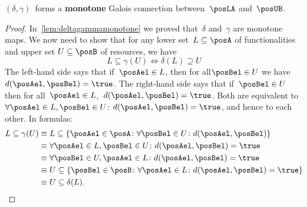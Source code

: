 \begin{lemma}
  $(\delta, \gamma)$~forms a \textbf{monotone} Galois connection between~$\posLA$ and~$\posUB$.
\end{lemma}
\begin{proof}
  In~\cref{lem:deltagammamonotone} we proved that~$\delta$ and~$\gamma$ are monotone maps.
  We now need to show that for any lower set~$L\subseteq \posA$ of functionalities and upper set $U\subseteq \posB$ of resources, we have
  \begin{equation}
    L\subseteq\gamma(U) \iff \delta(L)\supseteq U
  \end{equation}
  The left-hand side says that if~$\posAel\in L$, then for all$\posBel \in U$ we have $d(\posAel,\posBel)=\true$.
  The right-hand side says that if~$\posBel\in U$ then for all~$\posAel \in L$,~$d(\posAel,\posBel)=\true$.
  Both are equivalent to~$\forall \posAel\in L,\posBel\in U$: $d(\posAel,\posBel)=\true$, and hence to each other.
  In formulas:
  \begin{equation}
    \begin{aligned}
      L \subseteq \gamma(U)&\equiv L\subseteq \{\posAel \in \posA\colon \forall \posBel\in U\colon d(\posAel,\posBel)\} \\
      &\equiv \forall \posAel\in L, \posBel\in U \colon d(\posAel,\posBel)=\true \\
      &\equiv \forall \posBel\in U, \posAel\in L \colon d(\posAel,\posBel)=\true\\
      &\equiv U\subseteq \{\posBel\in \posB\colon \forall \posAel\in L\colon d(\posAel,\posBel)=\true \}\\
      &\equiv U\subseteq \delta(L).
    \end{aligned}
  \end{equation}
\end{proof}
